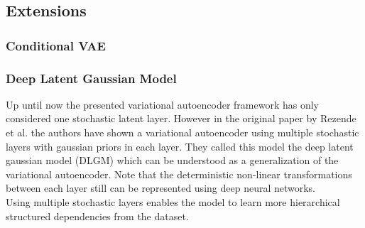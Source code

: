 
\newpage

\subsection{Extensions}
\label{sub:vae_extensions}

\subsubsection{Conditional VAE \cite{cvae:2014} \cite{cvae_2:2015}}
\label{ssub:cvae}


\newpage

\subsubsection{Deep Latent Gaussian Model}
Up until now the presented variational autoencoder framework has only considered one stochastic latent layer. However in the original paper by Rezende et al. \cite{dlgm:2014} the authors have shown a variational autoencoder using multiple stochastic layers with gaussian priors in each layer.
They called this model the deep latent gaussian model (DLGM) which can be understood as a generalization of the variational autoencoder.
Note that the deterministic non-linear transformations between each layer still can be represented using deep neural networks.\\
Using multiple stochastic layers enables the model to learn more hierarchical structured dependencies from the dataset.



